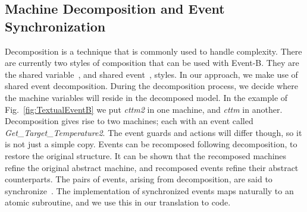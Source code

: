 \subsection{Machine Decomposition and Event Synchronization}\label{synchDecomp}
Decomposition is a technique that is commonly used to handle complexity. There are currently two styles of composition that can be used with Event-B. They are the shared variable~\cite{AbrialH07}, and shared event~\cite{Butler09a}, styles. In our approach, we make use of shared event decomposition. During the decomposition process, we decide where the machine variables will reside in the decomposed model. In the example of Fig.~\ref{fig:TextualEventB} we put \emph{cttm2} in one machine, and \emph{cttm} in another. Decomposition gives rise to two machines; each with an event called \emph{Get\_Target\_Temperature2}. The event guards and actions will differ though, so it is not just a simple copy. Events can be recomposed following decomposition, to restore the original structure. It can be shown that the recomposed machines refine the original abstract machine, and recomposed events refine their abstract counterparts. The pairs of events, arising from decomposition, are said to synchronize~\cite{Butler2006}. The implementation of synchronized events maps naturally to an atomic subroutine, and we use this in our translation to code.
